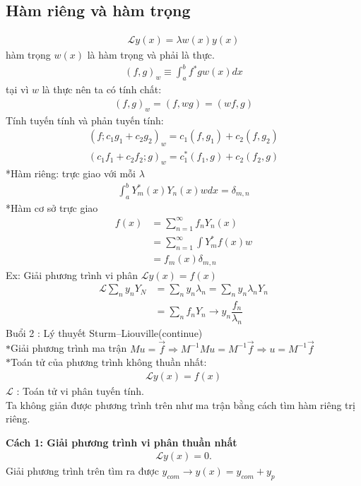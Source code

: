 \documentclass{report}
\newcommand{\s}{\ast}
\begin{document}
\subsection{Hàm riêng và hàm trọng}
\begin{align*}
	\mathcal{L}y(x) = \lambda w(x)y(x)
\end{align*}
hàm trọng $w(x)$ là hàm trọng và phải là thực.
\begin{align*}
	(f,g)_w \equiv \int_{a}^{b}f^*gw(x)dx
\end{align*}
tại vì $w$ là thực nên ta có tính chất:
\begin{align*}
	(f,g)_w = (f,wg) = (wf,g)
\end{align*}
Tính tuyến tính và phản tuyến tính:
\begin{align*}
	(f;c_1g_1+c_2g_2)_w = c_1(f,g_1) + c_2(f,g_2) \\
	(c_1f_1+c_2f_2;g)_w = c_1^*(f_1,g) + c_2(f_2,g)
\end{align*}
*Hàm riêng: trực giao với mỗi $\lambda$
\begin{align*}
	\int_{a}^{b}Y_m^*(x)Y_n(x)w dx = \delta_{m,n}
\end{align*}
*Hàm cơ sở trực giao
\begin{align*}
	f(x) & = \sum_{n=1}^{\infty}f_nY_n(x)         \\
	     & =\sum_{n=1}^{\infty} \int Y_m^* f(x) w \\
	     & =f_m(x) \delta_{m,n}
\end{align*}
Ex: Giải phương trình vi phân $\mathcal{L}y(x) = f(x)$
\begin{align*}
	\mathcal{L} \sum_{n}y_n Y_N & = \sum_{n}y_n\lambda_n = \sum_{n}y_n\lambda_nY_n         \\
	                            & = \sum_{n}f_n Y_n \rightarrow y_n \dfrac{f_n}{\lambda_n}
\end{align*}
\newpage
Buổi 2 : Lý thuyết Sturm–Liouville(continue)\\
$\s$Giải phương trình ma trận $Mu = \vec{f} \Rightarrow M^{-1}M u = M^{-1}\vec{f} \Rightarrow u = M^{-1}\vec{f} $\\
$\s$Toán tử của phương trình không thuần nhất:
\begin{align*}
	\mathcal{L}y(x) = f(x)
\end{align*}
$\mathcal{L}$ : Toán tử vi phân tuyến tính.\\
Ta không giản được phương trình trên như ma trận bằng cách tìm hàm riêng trị riêng.

\textbf{Cách 1: Giải phương trình vi phân thuần nhất}
\begin{align*}
	\mathcal{L}y(x) = 0.
\end{align*}
Giải phương trình trên tìm ra được $y_{com} \rightarrow y(x) = y_{com} + y_p$
\end{document}
